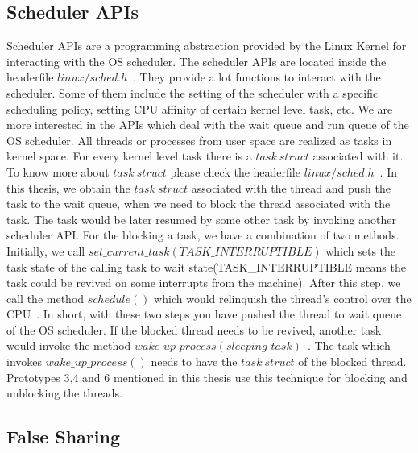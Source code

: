 \subsection{Scheduler APIs}

Scheduler APIs are a programming abstraction provided by the Linux Kernel for interacting with the OS scheduler. 
The scheduler APIs are located inside the headerfile $linux/sched.h$~\citep{schedheader}. 
They provide a lot functions to interact with the scheduler. 
Some of them include the setting of the scheduler with a specific scheduling policy, setting CPU affinity of certain kernel level task, etc. 
We are more interested in the APIs which deal with the wait queue and run queue of the OS scheduler. 
All threads or processes from user space are realized as tasks in kernel space. 
For every kernel level task there is a $task\ struct$ associated with it. 
To know more about $task\ struct$ please check the headerfile $linux/sched.h$~\citep{schedheader}. 
In this thesis, we obtain the $task\ struct$ associated with the thread and push the task to the wait queue, when we need to block the thread associated with the task. 
The task would be later resumed by some other task by invoking another scheduler API. 
For the blocking a task, we have a combination of two methods. 
Initially, we call $set\_current\_task(TASK\_INTERRUPTIBLE)$ which sets the task state of the calling task to wait state(TASK\_INTERRUPTIBLE means the task could be revived on some interrupts from the machine). 
After this step, we call the method $schedule()$ which would relinquish the thread's control over the CPU~\citep{schedheader}. 
In short, with these two steps you have pushed the thread to wait queue of the OS scheduler. 
If the blocked thread needs to be revived, another task would invoke the method $wake\_up\_process(sleeping\_task)$~\citep{schedheader}. 
The task which invokes $wake\_up\_process()$ needs to have the $task\ struct$ of the blocked thread. 
Prototypes 3,4 and 6 mentioned in this thesis use this technique for blocking and unblocking the threads. 
 

\subsection{False Sharing}

